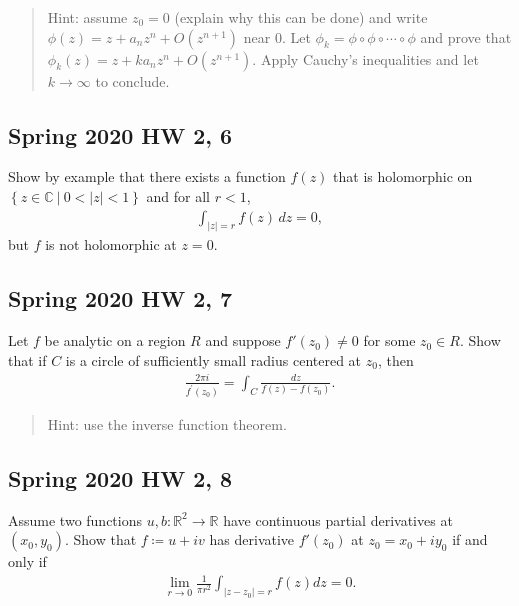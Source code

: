 \begin{quote}
Hint: assume \(z_0 = 0\) (explain why this can be done) and write
\(\phi(z) = z + a_n z^n + O(z^{n+1})\) near \(0\). Let
\(\phi_k = \phi \circ \phi \circ \cdots \circ \phi\) and prove that
\(\phi_k(z) = z + ka_nz^n + O(z^{n+1})\). Apply Cauchy's inequalities
and let \(k\to \infty\) to conclude.
\end{quote}

\hypertarget{spring-2020-hw-2-6}{%
\subsection{Spring 2020 HW 2, 6}\label{spring-2020-hw-2-6}}

Show by example that there exists a function \(f(z)\) that is
holomorphic on
\(\left\{{z\in {\mathbb{C}}{~\mathrel{\Big\vert}~}0 < {\left\lvert {z} \right\rvert} < 1}\right\}\)
and for all \(r<1\),
\begin{align*}
\int_{{\left\lvert {z} \right\rvert} = r} f(z) \, dz = 0
,\end{align*}
but \(f\) is not holomorphic at \(z=0\).

\hypertarget{spring-2020-hw-2-7}{%
\subsection{Spring 2020 HW 2, 7}\label{spring-2020-hw-2-7}}

Let \(f\) be analytic on a region \(R\) and suppose \(f'(z_0) \neq 0\)
for some \(z_0 \in R\). Show that if \(C\) is a circle of sufficiently
small radius centered at \(z_0\), then
\begin{align*}
\frac{2 \pi i}{f^{\prime}\left(z_{0}\right)}=\int_{C} \frac{d z}{f(z)-f\left(z_{0}\right)}
.\end{align*}

\begin{quote}
Hint: use the inverse function theorem.
\end{quote}

\hypertarget{spring-2020-hw-2-8}{%
\subsection{Spring 2020 HW 2, 8}\label{spring-2020-hw-2-8}}

Assume two functions \(u, b: {\mathbb{R}}^2 \to {\mathbb{R}}\) have
continuous partial derivatives at \((x_0 ,y_0)\). Show that
\(f \coloneqq u + iv\) has derivative \(f'(z_0)\) at
\(z_0 = x_0 + iy_0\) if and only if
\begin{align*}
\lim _{r \rightarrow 0} \frac{1}{\pi r^{2}} \int_{\left|z-z_{0}\right|=r} f(z) d z=0
.\end{align*}

